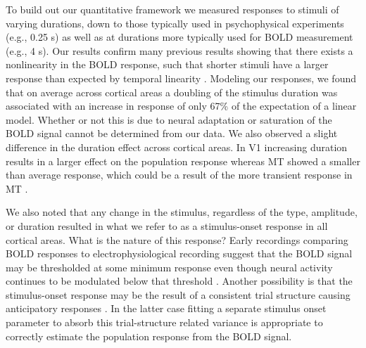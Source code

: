 To build out our quantitative framework we measured responses to stimuli of varying durations, down to those typically used in psychophysical experiments (e.g., 0.25 s) as well as at durations more typically used for BOLD measurement (e.g., 4 s). Our results confirm many previous results showing that there exists a nonlinearity in the BOLD response, such that shorter stimuli have a larger response than expected by temporal linearity \citep{Boynton1996-ff,Boynton2012-xy}. Modeling our responses, we found that on average across cortical areas a doubling of the stimulus duration was associated with an increase in response of only 67\% of the expectation of a linear model. Whether or not this is due to neural adaptation \citep{Buxton2004-rg} or saturation of the BOLD signal \citep{Friston1998-bo} cannot be determined from our data. We also observed a slight difference in the duration effect across cortical areas. In V1 increasing duration results in a larger effect on the population response whereas MT showed a smaller than average response, which could be a result of the more transient response in MT \citep{Stigliani2017-oe}.

We also noted that any change in the stimulus, regardless of the type, amplitude, or duration resulted in what we refer to as a stimulus-onset response in all cortical areas. What is the nature of this response? Early recordings comparing BOLD responses to electrophysiological recording suggest that the BOLD signal may be thresholded at some minimum response even though neural activity continues to be modulated below that threshold \citep{Logothetis2001-kk}. Another possibility is that the stimulus-onset response may be the result of a consistent trial structure causing anticipatory responses \citep{Cardoso2012-cu}. In the latter case fitting a separate stimulus onset parameter to absorb this trial-structure related variance is appropriate to correctly estimate the population response from the BOLD signal.

